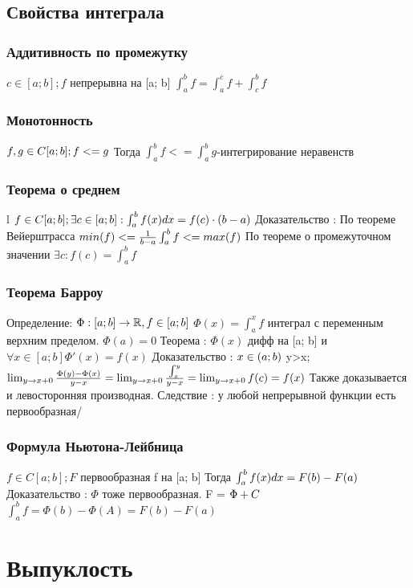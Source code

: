 \documentclass[12pt, a4paper]{article}
\newcommand{\nl}{\newline}
\newcommand{\intba}{\int^b_a}
\begin{document}
	\subsection{Свойства интеграла}
	\subsubsection{Аддитивность по промежутку}
	$c \in [a;b]; f$ непрерывна на [a; b] \nl
	$\int_a^b f = \int_a^c f + \int^b_c f$ \nl
	\subsubsection{Монотонность} 
	$f, g \in C[a; b]; f<=g \nl$
	Тогда $\int^b_a f <= \int^b_a g$-интегрирование неравенств \nl
	\subsubsection{Теорема о среднем}l
	$f \in C[a;b]; \exists c \in [a;b] : \int^b_a f(x)dx = f(c) \cdot (b-a) \nl$
	Доказательство : \nl
	По теореме Вейерштрасса $min(f) <= \frac{1}{b-a}\intba f <=max(f) \nl$
	По теореме о промежуточном значении $\exists c : f(c) = \intba f$
	
	\subsubsection{Теорема Барроу}
	Определение: \nl
	$\Phi : [a;b] \rightarrow \mathbb{R}, f \in [a;b] \nl$
	$\Phi(x) = \int_a^x f$ интеграл с переменным верхним пределом. \nl
	$\Phi(a) = 0$
	Теорема : 
	$\Phi(x)$ дифф на [a; b] и $\forall x \in [a; b] \Phi'(x) = f(x)$ \nl
	Доказательство : \nl
	$x \in (a; b) \nl$
	y>x; $\lim_{y \to x+0} \frac{\Phi(y)-\Phi(x)}{y-x} = \lim_{y \to x+0}\frac{\int^y_x}{y-x} = \lim_{y \to x+0} f(c) = f(x) \nl $
	Также доказывается и левосторонняя производная. \nl
	Следствие : у любой непрерывной функции есть первообразная/
	
	\subsubsection{Формула Ньютона-Лейбница}
	$f \in C[a; b]; F$ первообразная f на [a; b]\nl
	Тогда $\intba f(x)dx = F(b)-F(a) \nl$
	Доказательство : \nl
	$\Phi$ тоже первообразная. F = $\Phi + C\nl$
	$\intba f = \Phi(b)-\Phi(A) = F(b)-F(a)$
	
	
	
	
	
	\section{Выпуклость}
	
\end{document}
